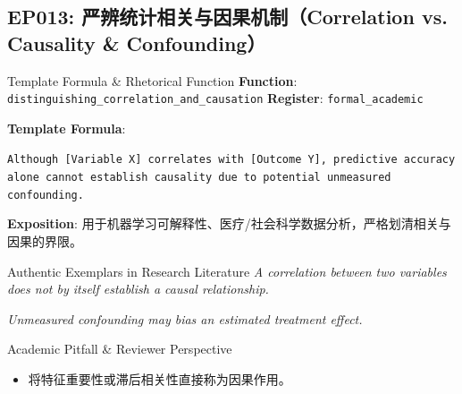 \subsection{EP013: 严辨统计相关与因果机制（Correlation vs. Causality \& Confounding）}\label{sec:ep:EP013}
\begin{ConceptBox}{Template Formula \& Rhetorical Function}
\textbf{Function}: \texttt{distinguishing\_correlation\_and\_causation} \quad \textbf{Register}: \texttt{formal\_academic}\par\vspace{3pt}
\textbf{Template Formula}:\par\noindent\texttt{Although [Variable X] correlates with [Outcome Y], predictive accuracy alone cannot establish causality due to potential unmeasured confounding.}\par\vspace{4pt}
\textbf{Exposition}: 用于机器学习可解释性、医疗/社会科学数据分析，严格划清相关与因果的界限。
\end{ConceptBox}
\begin{ExampleBox}{Authentic Exemplars in Research Literature}
\textit{A correlation between two variables does not by itself establish a causal relationship.}\par\vspace{2pt}
\textit{Unmeasured confounding may bias an estimated treatment effect.}\par\vspace{2pt}
\end{ExampleBox}
\begin{TipBox}{Academic Pitfall \& Reviewer Perspective}
\begin{itemize}[leftmargin=1.5em, itemsep=1pt]
  \item 将特征重要性或滞后相关性直接称为因果作用。
\end{itemize}
\end{TipBox}
\vspace{6pt}
